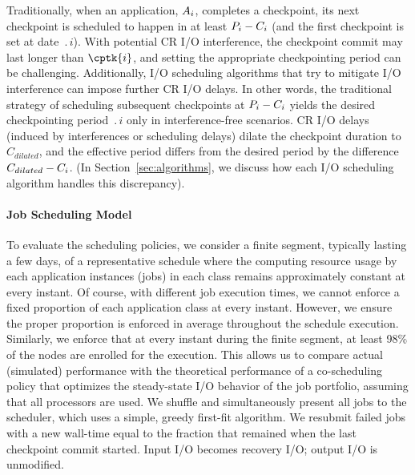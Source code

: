 Traditionally, when an application, $A_{i}$, completes a checkpoint, its next
checkpoint is scheduled to happen in at least $P_{i}-C_{i}$ (and the first
checkpoint is set at date $\period{i}$). With potential CR I/O interference,
the checkpoint commit may last longer than $\cptk{i}$, and setting
the appropriate checkpointing period can be challenging.
Additionally, I/O scheduling algorithms that try to mitigate I/O interference can
impose further CR I/O delays.  In other words, the traditional strategy of scheduling
subsequent checkpoints at $P_{i}-C_{i}$ yields the desired checkpointing
period $\period{i}$ only in interference-free scenarios. CR I/O delays (induced by
interferences or scheduling delays) dilate the checkpoint duration to $C_{dilated}$,
and the effective period differs from the desired period by the difference
$C_{dilated}-C_{i}$.  (In Section~\ref{sec:algorithms}, we discuss how each I/O
scheduling algorithm handles this discrepancy).

\paragraph*{Job Scheduling Model}
To evaluate the scheduling policies, we consider a finite segment, typically lasting
a few days, of a representative schedule where the computing resource usage by each application
instances (jobs) in each class remains approximately constant at every instant. Of
course, with different job execution times, we cannot enforce a fixed proportion of
each application class at every instant. However, we ensure the proper proportion is
enforced in average throughout the schedule execution. Similarly, we enforce that at
every instant during the finite segment, at least 98\% of the nodes are enrolled for
the execution. This allows us to compare actual (simulated) performance with the
theoretical performance of a co-scheduling policy that optimizes the steady-state I/O
behavior of the job portfolio, assuming that all processors are used. We shuffle and
simultaneously present all jobs to the scheduler, which uses a simple, greedy
first-fit algorithm.  We resubmit failed jobs with a new wall-time equal to the
fraction that remained when the last checkpoint commit started. Input I/O becomes
recovery I/O; output I/O is unmodified.

